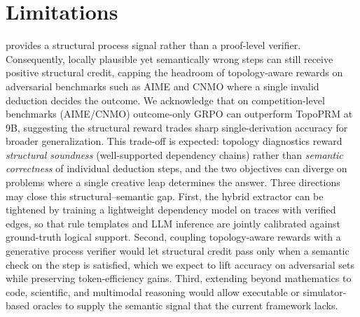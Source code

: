 \section*{Limitations}
\label{sec:limitations_future}
\method provides a structural process signal rather than a proof-level verifier. Consequently, locally plausible yet semantically wrong steps can still receive positive structural credit, capping the headroom of topology-aware rewards on adversarial benchmarks such as AIME and CNMO where a single invalid deduction decides the outcome.
We acknowledge that on competition-level benchmarks (AIME/CNMO) outcome-only GRPO can outperform TopoPRM at 9B, suggesting the structural reward trades sharp single-derivation accuracy for broader generalization. This trade-off is expected: topology diagnostics reward \emph{structural soundness} (well-supported dependency chains) rather than \emph{semantic correctness} of individual deduction steps, and the two objectives can diverge on problems where a single creative leap determines the answer.
Three directions may close this structural--semantic gap. First, the hybrid extractor can be tightened by training a lightweight dependency model on traces with verified edges, so that rule templates and LLM inference are jointly calibrated against ground-truth logical support. Second, coupling topology-aware rewards with a generative process verifier would let structural credit pass only when a semantic check on the step is satisfied, which we expect to lift accuracy on adversarial sets while preserving token-efficiency gains. Third, extending \method beyond mathematics to code, scientific, and multimodal reasoning would allow executable or simulator-based oracles to supply the semantic signal that the current framework lacks.
